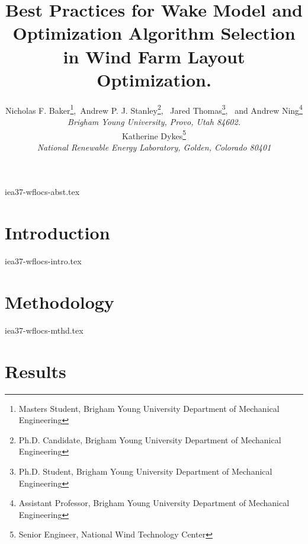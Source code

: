 \documentclass[]{aiaa-tc} %
\title{Best Practices for Wake Model and Optimization Algorithm Selection in Wind Farm Layout Optimization.}
\author{Nicholas F. Baker\thanks{Masters Student, Brigham Young University Department of Mechanical Engineering},\  Andrew P. J. Stanley\thanks{Ph.D. Candidate, Brigham Young University Department of Mechanical Engineering}, \ Jared Thomas\thanks{Ph.D. Student, Brigham Young University Department of Mechanical Engineering}, \ and Andrew Ning\thanks{Assistant Professor, Brigham Young University Department of Mechanical Engineering} \\
	{\normalsize\itshape Brigham Young University, Provo, Utah 84602.}\\
Katherine Dykes\thanks{Senior Engineer, National Wind Technology Center}\\
	\normalsize\itshape National Renewable Energy Laboratory, Golden, Colorado 80401}
\begin{document}
\maketitle{}

{iea37-wflocs-abst.tex}



	
\section{Introduction}

	{iea37-wflocs-intro.tex}

\section{Methodology} \label{sec:meth}

	{iea37-wflocs-mthd.tex}

\section{Results} \label{sec:res}
\end{document}
